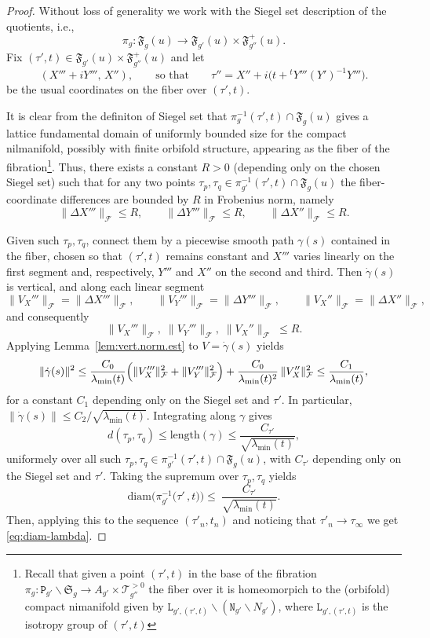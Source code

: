 \documentclass[11pt]{amsart}
\theoremstyle{plain}
\theoremstyle{definition}
\theoremstyle{remark}
\newcommand{\fS}{\mathfrak{S}}
\newcommand{\tP}{\mathtt{P}}
\newcommand{\tN}{\mathtt{N}}
\newcommand{\tL}{\mathtt{L}}
\newcommand{\fF}{\mathfrak{F}}
\newcommand{\diam}{\mathrm{diam}}
\newcommand{\cT}[1]{\mathscr{T}_{#1}^{\scriptscriptstyle{>0}}}
\begin{document}
\begin{proof}
Without loss of generality we work with the Siegel set description of the quotients, i.e.,
\[
    \pi_{g}:\fF_g(u)\longrightarrow\fF_{g'}(u)\times\fF^{+}_{g''}(u).
\]
Fix $(\tau',t)\in \fF_{g'}(u)\times\fF^{+}_{g''}(u)$ and let 
\[
    (X'''+iY''',\,X''),
    \qquad\text{so that}\qquad
    \tau''=X'' + i\bigl(t+{}^tY'''(Y')^{-1}Y'''\bigr).
\]
be the usual coordinates on the fiber over $(\tau',t)$. 

It is clear from the definiton of Siegel set that $\pi^{-1}_{g}(\tau',t)\cap \fF_g(u)$  gives a lattice fundamental domain of uniformly bounded size for the compact nilmanifold, possibly with finite orbifold structure, appearing as the fiber of the fibration\footnote{Recall that given a point $(\tau',t)$ in the base of the fibration $\pi_g: \tP_{g'}\backslash \fS_g\to A_{g'}\times\cT{g''}$ the fiber over it is homeomorpich to the (orbifold) compact nimanifold given by $\tL_{g',(\tau',t)}\backslash(\tN_{g'}\backslash N_{g'})$, where $\tL_{g',(\tau',t)}$ is the isotropy group of $(\tau',t)$}. Thus, there exists a constant $R>0$ (depending only on the chosen Siegel set) such that for any two points $\tau_p,\tau_q\in \pi_{g'}^{-1}(\tau',t)\cap\fF_g(u)$ the fiber-coordinate differences are bounded by $R$ in Frobenius norm, namely
\begin{equation}\label{eq:bounded-increments}
\|\Delta X'''\|_{\mathcal {F}}\le R,\qquad
\|\Delta Y'''\|_{\mathcal {F}}\le R,\qquad
\|\Delta X''\|_{\mathcal {F}}\le R.
\end{equation}

Given such $\tau_p,\tau_q$, connect them by a piecewise smooth path $\gamma(s)$ contained in the fiber, chosen so that $(\tau',t)$ remains constant and $X'''$ varies linearly on the first segment and, respectively, $Y'''$ and $X''$ on the second and third. Then $\dot\gamma(s)$ is vertical, and along each linear segment
\[
\|V_X'''\|_{\mathcal{F}}=\|\Delta X'''\|_{\mathcal{F}},\qquad
\|V_Y'''\|_{\mathcal{F}}=\|\Delta Y'''\|_{\mathcal{F}},\qquad
\|V_X''\|_{\mathcal{F}}=\|\Delta X''\|_{\mathcal{F}},
\]
and consequently
\[
\|V_X'''\|_{\mathcal{F}},\;\|V_Y'''\|_{\mathcal{F}},\;\|V_X''\|_{\mathcal{F}}\;\le R.
\]
Applying Lemma~\ref{lem:vert.norm.est} to $V=\dot\gamma(s)$ yields
\[
\|\dot\gamma(s)\|^2
\le
\frac{C_0}{\lambda_{\min}(t)}\Bigl(\|V_X'''\|_{\mathcal{F}}^2+\|V_Y'''\|_{\mathcal{F}}^2\Bigr)
+
\frac{C_0}{\lambda_{\min}(t)^2}\,\|V_X''\|_{\mathcal{F}}^2
\le
\frac{C_1}{\lambda_{\min}(t)},
\]
for a constant $C_1$ depending only on the Siegel set and $\tau'$. In particular, $\|\dot\gamma(s)\|\le C_2/\sqrt{\lambda_{\min}(t)}$. Integrating along $\gamma$ gives
\[
d(\tau_p,\tau_q)\le \mathrm{length}(\gamma)
\le \frac{C_{\tau'}}{\sqrt{\lambda_{\min}(t)}},
\]
uniformely over all such $\tau_p,\tau_q\in \pi_{g'}^{-1}(\tau',t)\cap \fF_g(u)$, with $C_{\tau'}$ depending only on the Siegel set and $\tau'$. Taking the supremum over $\tau_p,\tau_q$ yields 
\[
\diam\big(\pi_{g'}^{-1}\big(\tau'\,,t\big)\big) \le\ \frac{C_{\tau'}}{\sqrt{\lambda_{\min}(t)}}.
\]
Then, applying this to the sequence $(\tau'_n,t_n)$ and noticing that $\tau'_n\to \tau_\infty$ we get \eqref{eq:diam-lambda}.


\end{proof}
\end{document}
